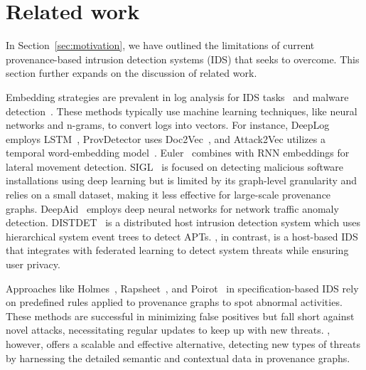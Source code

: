 \section{Related work}
\label{s:relwk}
In Section~\ref{sec:motivation}, we have outlined the limitations of current provenance-based intrusion detection systems (IDS) that \Sys seeks to overcome. This section further expands on the discussion of related work.

 Embedding strategies are prevalent in log analysis for IDS tasks~\cite{aljawarneh2018anomaly, maseer2021benchmarking, gyanchandani2012taxonomy,atlas} and malware detection~\cite{zolkipli2011approach, chakkaravarthy2019survey, isohara2011kernel}. These methods typically use machine learning techniques, like neural networks and n-grams, to convert logs into vectors. For instance, DeepLog employs LSTM~\cite{deeplog2017}, ProvDetector uses Doc2Vec~\cite{provdetector2020, le2014distributed}, and Attack2Vec utilizes a temporal word-embedding model~\cite{shen2019attack2vec}. Euler~\cite{king2022euler} combines \gnnshort with RNN embeddings for lateral movement detection. SIGL~\cite{sigl} is focused on detecting malicious software installations using deep learning but is limited by its graph-level granularity and relies on a small dataset, making it less effective for large-scale provenance graphs. DeepAid~\cite{deepaid} employs deep neural networks for network traffic anomaly detection. DISTDET~\cite{dong2023distdet} is a distributed host intrusion detection system which uses hierarchical system event trees to detect APTs. \Sys, in contrast, is a host-based IDS that integrates \gnnshort with federated learning to detect system threats while ensuring user privacy.

 Approaches like Holmes~\cite{holmes2019}, Rapsheet~\cite{rapsheet2020}, and Poirot~\cite{poirot2019} in specification-based IDS rely on predefined rules applied to provenance graphs to spot abnormal activities. These methods are successful in minimizing false positives but fall short against novel attacks, necessitating regular updates to keep up with new threats. \Sys, however, offers a scalable and effective alternative, detecting new types of threats by harnessing the detailed semantic and contextual data in provenance graphs.


